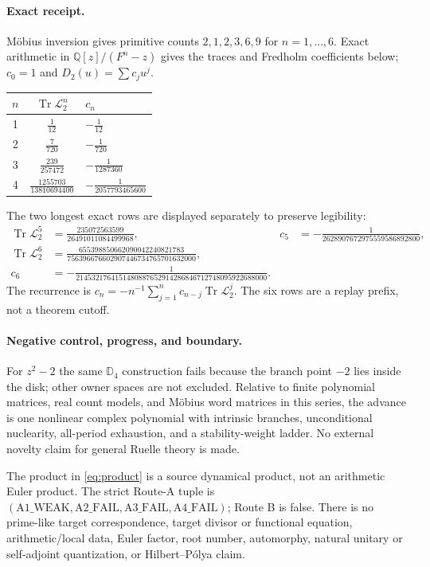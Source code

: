 \documentclass[10pt]{article}
\newcommand{\D}{\mathbb D}
\newcommand{\Lop}{\mathcal L}
\newcommand{\Tr}{\operatorname{Tr}}
\begin{document}
\paragraph{Exact receipt.}
M\"obius inversion gives primitive counts $2,1,2,3,6,9$ for $n=1,\ldots,6$.  Exact arithmetic in $\mathbb Q[z]/(F^n-z)$ gives the traces and Fredholm coefficients below; $c_0=1$ and $D_2(u)=\sum c_j u^j$.
\begin{center}\small
\renewcommand{\arraystretch}{1.15}
\begin{tabular}{@{}ccl@{}}
\toprule
$n$ & $\Tr\Lop_2^n$ & $c_n$\\
\midrule
1 & $\frac{1}{12}$ & $-\frac{1}{12}$\\
2 & $\frac{7}{720}$ & $-\frac{1}{720}$\\
3 & $\frac{239}{257472}$ & $-\frac{1}{1287360}$\\
4 & $\frac{1255703}{13810694400}$ & $-\frac{1}{2057793465600}$\\
\bottomrule
\end{tabular}
\end{center}
The two longest exact rows are displayed separately to preserve legibility:
\begin{align*}
 \Tr\Lop_2^5&=\frac{235072563599}{26491011084499968},
 &c_5&=-\frac{1}{2628907672975559586892800},\\
 \Tr\Lop_2^6&=\frac{655398850662090042240821783}{756396676602907446734765701632000},\\[-2pt]
 c_6&=-\frac{1}{2145321764151480887652914286846712748095922688000}.
\end{align*}
The recurrence is $c_n=-n^{-1}\sum_{j=1}^n c_{n-j}\Tr\Lop_2^j$.  The six rows are a replay prefix, not a theorem cutoff.

\paragraph{Negative control, progress, and boundary.}
For $z^2-2$ the same $\D_4$ construction fails because the branch point $-2$ lies inside the disk; other owner spaces are not excluded.  Relative to finite polynomial matrices, real count models, and M\"obius word matrices in this series, the advance is one nonlinear complex polynomial with intrinsic branches, unconditional nuclearity, all-period exhaustion, and a stability-weight ladder.  No external novelty claim for general Ruelle theory is made.

The product in \eqref{eq:product} is a source dynamical product, not an arithmetic Euler product.  The strict Route-A tuple is
$(\mathrm{A1\_WEAK},\mathrm{A2\_FAIL},\mathrm{A3\_FAIL},\mathrm{A4\_FAIL})$;
Route B is false.  There is no prime-like target correspondence, target divisor or functional equation, arithmetic/local data, Euler factor, root number, automorphy, natural unitary or self-adjoint quantization, or Hilbert--P\'olya claim.
\end{document}
